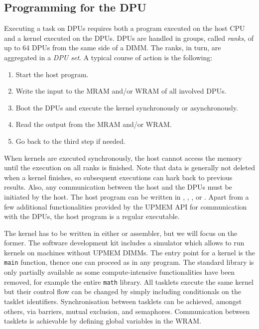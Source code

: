 \subsection{Programming for the \acs*{DPU}}
\label{sec:prereq:arch:code}

Executing a task on \acp{DPU} requires both a program executed on the host \ac{CPU} and a kernel executed on the \acp{DPU}.
\Acp{DPU} are handled in groups, called \emph{ranks}, of up to 64 \acp{DPU} from the same side of a \ac{DIMM}.
The ranks, in turn, are aggregated in a \emph{\ac{DPU} set}.
A typical course of action is the following:
\begin{enumerate}
	\item
	Start the host program.

	\item
	Write the input to the \ac{MRAM} and/or \ac{WRAM} of all involved \acp{DPU}.

	\item
	Boot the \acp{DPU} and execute the kernel synchronously or asynchronously.

	\item
	Read the output from the \ac{MRAM} and/or \ac{WRAM}.

	\item
	Go back to the third step if needed.
\end{enumerate}
When kernels are executed synchronously, the host cannot access the memory until the execution on all ranks is finished.
Note that data is generally not deleted when a kernel finishes, so subsequent executions can hark back to previous results.
Also, any communication between the host and the \acp{DPU} must be initiated by the host.
The host program can be written in \langC{}, \langCpp{}, \langJava{}, or \langPython{}.
Apart from a few additional functionalities provided by the UPMEM \ac{API} for communication with the \acp{DPU}, the host program is a regular executable.

The kernel has to be written in either \langC{} or assembler, but we will focus on the former.
The software development kit includes a simulator which allows to run kernels on machines without UPMEM \acp{DIMM}.
The entry point for a kernel is the \lstinline|main| function, thence one can proceed as in any \langC{} program.
The \langC{} standard library is only partially available as some compute-intensive functionalities have been removed, for example the entire \lstinline|math| library.
All tasklets execute the same kernel but their control flow can be changed by simply including conditionals on the tasklet identifiers.
Synchronisation between tasklets can be achieved, amongst others, via barriers, mutual exclusion, and semaphores.
Communication between tasklets is achievable by defining global variables in the \ac{WRAM}.


